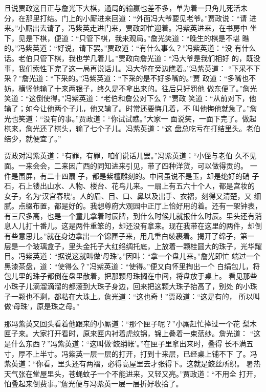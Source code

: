 且说贾政这日正与詹光下大棋，通局的输赢也差不多，单为着一只角儿死活未
分，在那里打结。门上的小厮进来回道：“外面冯大爷要见老爷。”贾政说：“请
进来。”小厮出去请了，冯紫英走进门来，贾政即忙迎着。冯紫英进来，在书房中
坐下，见是下棋，便道：“只管下棋，我来观局。”詹光笑道：“晚生的棋是不堪
瞧的。”冯紫英道：“好说，请下罢。”贾政道：“有什么事么？”冯紫英道：“没
有什么话。老伯只管下棋，我也学几着儿。”贾政向詹光道：“冯大爷是我们相好
的，既没事，我们索性下完了这一局再说话儿。冯大爷在旁边瞧着。”冯紫英道：
“下采不下采？”詹光道：“下采的。”冯紫英道：“下采的是不好多嘴的。”贾
政道：“多嘴也不妨，横竖他输了十来两银子，终久是不拿出来的。往后只好罚他
做东便了。”詹光笑道：“这倒使得。”冯紫英道：“老伯和詹公对下么？”贾政
笑道：“从前对下，他输了；如今让他两个子儿，他又输了。时常还要悔几着，不
叫他悔他就急了。”詹光也笑道：“没有的事。”贾政道：“你试试瞧。”大家一
面说笑，一面下完了。做起棋来，詹光还了棋头，输了七个子儿。冯紫英道：“这
盘总吃亏在打结里头。老伯结少，就便宜了。”

贾政对冯紫英道：“有罪，有罪，咱们说话儿罢。”冯紫英道：“小侄与老伯
久不见面。一来会会，二来因广西的同知进来引见，带了四种洋货，可以做得贡的。
一件是围屏，有二十四扇子，都是紫檀雕刻的。中间虽说不是玉，却是绝好的硝
子石，石上镂出山水、人物、楼台、花鸟儿来。一扇上有五六十个人，都是宫妆的
女子，名为‘汉宫春晓’。人的眉、目、口、鼻以及出手、衣褶，刻得又清楚，又
细腻。点缀布置，都是好的。我想尊府大观园中正厅上恰好用的着。还有一架钟表，
有三尺多高，也是一个童儿拿着时辰牌，到什么时候儿就报什么时辰。里头还有消
息人儿打十番儿。这是两件重笨的，却还没有拿来。现在我带在这里的两件，却倒
有些意思儿。”就在身边拿出一个锦匣子来，用几重白绫裹着。揭开了绵子，第一
层是一个玻璃盒子，里头金托子大红绉绸托底，上放着一颗桂圆大的珠子，光华耀
目。冯紫英道：“据说这就叫做‘母珠’。”因叫：“拿一个盘儿来。”詹光即忙
端过一个黑漆茶盘，道：“使得么？”冯紫英道：“使得。”便又向怀里掏出一个
白绢包儿，将包儿里的珠子都倒在盘里散着，把那颗母珠搁在中间，将盘放于桌上。
看见那些小珠子儿滴溜滴溜的都滚到大珠子身边，回来把这颗大珠子抬高了，别处
的小珠子一颗也不剩，都粘在大珠上。詹光道：“这也奇！”贾政道：“这是有的，
所以叫做‘母珠’，原是珠之母。”

那冯紫英又回头看着他跟来的小厮道：“那个匣子呢？”小厮赶忙捧过一个花
梨木匣子来。大家打开看时，原来匣内衬着虎纹锦，锦上叠着一束蓝纱。詹光道：
“这是什么东西？”冯紫英道：“这叫做‘鲛绡帐’。”在匣子里拿出来时，叠得
长不满五寸，厚不上半寸。冯紫英一层一层的打开，打到十来层，已经桌上铺不下
了。冯紫英道：“你看，里头还有两褶，必得高屋里去才张得下。这就是鲛丝所织。
暑热天气张在堂屋里头，苍蝇蚊子一个不能进来，又轻又亮。”贾政道：“不用全
打开，怕叠起来倒费事。”詹光便与冯紫英一层一层折好收拾了。

